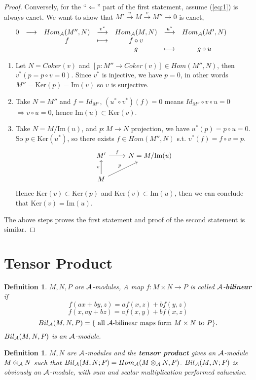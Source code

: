 \documentclass[11pt]{article}
\newtheorem{dfn}[thm]{Definition}
\newcommand{\cala}{{\cal A}}
\newcommand{\Lrta}{\Longrightarrow}
\newcommand{\lrta}{\longrightarrow}
\newcommand{\Llta}{\Longleftarrow}
\begin{document}
\begin{proof}
 Conversely, for the ``$\Llta$'' part of the first statement, assume (\ref{eq:1}) is always exact. We want to show that $M'\overset{u}{\lrta}M\overset{v}{\lrta}M'' \lrta0$ is exact, 
 $$
\begin{array}{ c c c c c c c c c}
0 & \longrightarrow  & Hom_\cala(M'',N) & \overset{v^*}{\longrightarrow } & Hom_\cala(M,N) & \overset{u^*}{\longrightarrow } & Hom_\cala(M',N) &  & \\
 &  & f &\longmapsto  & f\circ v &  &  &  & \\
 &  &  &  & g & \longmapsto & g\circ u &  &
\end{array}
 $$
 \begin{enumerate}
\item Let $N=Coker(v)$ and $[p:M''\lrta Coker(v)]\in Hom(M'',N)$, then $v^*(p=p\circ v=0)$. Since $v^*$ is injective, we have $p=0$, in other words $M''=\text{Ker}(p)=\text{Im}(v)$ so $v$ is surjective.
\item Take $N=M''$ and $f=Id_{M''}$, $(u^*\circ v^*)(f)=0$ means $Id_{M''}\circ v\circ u=0$ $\Lrta v\circ u=0$, hence $\text{Im}(u)\subset \text{Ker}(v)$.
\item  Take $N=M/\text{Im}(u)$, and $p:M\lrta N$ projection, we have $u^*(p)=p\circ u=0$. So $p\in \text{Ker}(u^*)$, so there exists $f\in Hom(M'',N) $ s.t. $v^*(f)=f\circ v=p$. 
\[
\begin{tikzcd}
 M'  \arrow[r,"f"] & N=M/\text{Im}(u) \\
M\arrow[ur,"p"] \arrow[u,"v"] &    
\end{tikzcd}
\]
Hence $\text{Ker}(v)\subset \text{Ker}(p)$ and $\text{Ker}(v)\subset \text{Im}(u)$, then we can conclude that $\text{Ker}(v)=\text{Im}(u)$.
\end{enumerate}
The above steps proves the first statement and proof of the second statement is similar.
\end{proof}
\section*{Tensor Product}
\begin{dfn}
$M,N,P$  are $\cala$-modules, A map $f:M\times N\lrta P$ is called $\cala$-\textbf{bilinear} if 
$$
f(ax+by, z)=af(x,z)+bf(y,z)
$$
$$
f(x,ay+bz)=a f(x,y)+bf(x,z)
$$
$$
Bil_{\cala}(M,N,P)=\{\text{ all $\cala$-bilinear maps form $M\times N$ to $P$}\}.
$$
$Bil_{\cala}(M,N,P)$ is an $\cala$-module.
\end{dfn}

\begin{dfn}\label{def:tensor_product}
$M,N$ are $\cala$-modules and the \textbf{tensor product} gives an $\cala$-module $M\otimes_\cala N$ such that $Bil_\cala(M,N;P)=Hom_{\cala}(M\otimes_\cala N,P)$. $Bil_\cala(M,N;P)$ is obviously an $\cala$-module, with sum and scalar multiplication performed valuewise.
\end{dfn}
\end{document}
